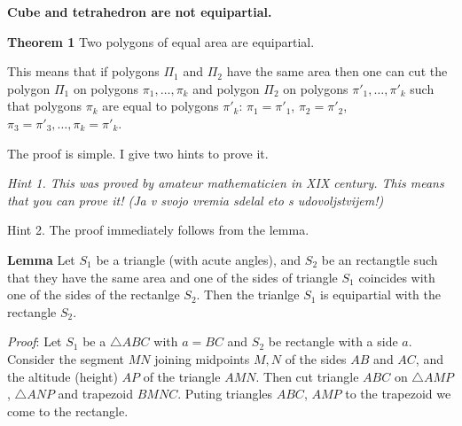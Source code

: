\def\vare {\varepsilon}
\def\A {{\bf A}}
\def\t {\tilde}
\def\a {\alpha}
\def\K {{\bf K}}
\def\N {{\bf N}}
\def\V {{\cal V}}
\def\s {{\sigma}}
\def\S {{\Sigma}}
\def\s {{\sigma}}
\def\p{\partial}
\def\vare{{\varepsilon}}
\def\Q {{\bf Q}}
\def\D {{\cal D}}
\def\G {{\Gamma}}
\def\C {{\bf C}}
\def\M {{\cal M}}
\def\Z {{\bf Z}}
\def\U  {{\cal U}}
\def\H {{\cal H}}
\def\R  {{\bf R}}
\def\S  {{\bf S}}
\def\E  {{\bf E}}
\def\l {\lambda}
\def\degree {{\bf {\rm degree}\,\,}}
\def \finish {${\,\,\vrule height1mm depth2mm width 8pt}$}
\def \m {\medskip}
\def\p {\partial}
\def\r {{\bf r}}
\def\v {{\bf v}}
\def\n {{\bf n}}
\def\t {{\bf t}}
\def\b {{\bf b}}
\def\c {{\bf c }}
\def\e{{\bf e}}
\def\ac {{\bf a}}
\def \X   {{\bf X}}
\def \Y   {{\bf Y}}
\def \x   {{\bf x}}
\def \y   {{\bf y}}
\def \G{{\cal G}}

\centerline {\bf Cube and tetrahedron are not equipartial.}

  \bigskip

   {\bf Theorem 1} Two polygons of equal area
   are equipartial.

    This means that if polygons $\Pi_1$ and $\Pi_2$ have the same area then one can cut
     the polygon $\Pi_1$ on polygons $\pi_1,\dots,\pi_k$ and
     polygon  $\Pi_2$ on polygons $\pi'_1,\dots,\pi'_k$ such that polygons $\pi_k$
     are equal to polygons $\pi'_k$: $\pi_1=\pi'_1$,  $\pi_2=\pi'_2$, $\pi_3=\pi'_3,\dots, \pi_k=\pi'_k$.





  The proof is simple.   I give two hints to prove it.

\m

   {\it Hint 1. This was proved by amateur mathematicien in XIX century.   This means
    that you can prove it! (Ja v svojo vremia  sdelal eto s udovoljstvijem!)}

    Hint 2. The proof immediately follows from the lemma.

\m

   {\bf Lemma}  Let $S_1$ be a triangle (with acute angles), and $S_2$ be an rectangtle
   such that they have the same area
      and one of the sides of triangle $S_1$ coincides with one of the sides of the rectanlge  $S_2$.
     Then the trianlge $S_1$ is equipartial with the rectangle $S_2$.

     {\it Proof}: Let $S_1$ be a $\triangle ABC$ with $a=BC$ and $S_2$ be rectangle with a side $a$.
      Consider the segment $MN$ joining midpoints $M,N$ of the sides $AB$ and $AC$,
      and the altitude (height) $AP$ of the triangle $AMN$. Then cut triangle $ABC$
      on $\triangle AMP$, $\triangle ANP$ and trapezoid $BMNC$. Puting triangles
      $ABC$, $AMP$ to the trapezoid we come to the rectangle.

